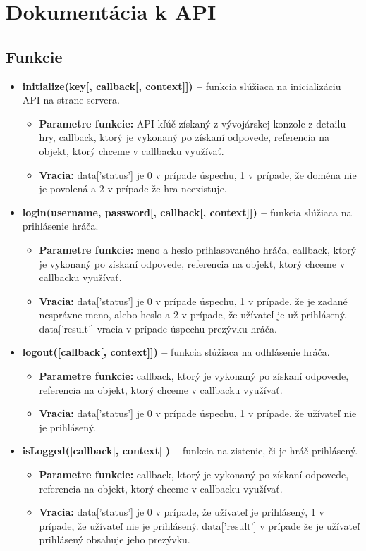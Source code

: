 \chapter{Dokumentácia k API}
\section{Funkcie}
\begin{itemize}
\item \textbf{initialize(key[, callback[, context]]) –} funkcia slúžiaca na inicializáciu API na strane servera. 
\begin{itemize}
\item \textbf{Parametre funkcie:} API kľúč získaný z vývojárskej konzole z detailu hry, callback, ktorý je vykonaný po získaní odpovede, referencia na objekt, ktorý chceme v callbacku využívať. 
\item \textbf{Vracia:} data['status'] je 0 v prípade úspechu, 1 v prípade, že doména nie je povolená a 2 v prípade že hra neexistuje.
\end{itemize}

\item \textbf{login(username, password[, callback[, context]]) –} funkcia slúžiaca na prihlásenie hráča.
\begin{itemize}
\item \textbf{Parametre funkcie:} meno a heslo prihlasovaného hráča, callback, ktorý je vykonaný po získaní odpovede, referencia na objekt, ktorý chceme v callbacku využívať. 
\item \textbf{Vracia:} data['status'] je 0 v prípade úspechu, 1 v prípade, že je zadané nesprávne meno, alebo heslo a 2 v prípade, že užívateľ je už prihlásený. data['result'] vracia v prípade úspechu prezývku hráča.
\end{itemize}

\item \textbf{logout([callback[, context]]) –} funkcia slúžiaca na odhlásenie hráča.
\begin{itemize}
\item \textbf{Parametre funkcie:} callback, ktorý je vykonaný po získaní odpovede, referencia na objekt, ktorý chceme v callbacku využívať. 
\item \textbf{Vracia:} data['status'] je 0 v prípade úspechu, 1 v prípade, že užívateľ nie je prihlásený.
\end{itemize}

\item \textbf{isLogged([callback[, context]]) –} funkcia na zistenie, či je hráč prihlásený.
\begin{itemize}
\item \textbf{Parametre funkcie:} callback, ktorý je vykonaný po získaní odpovede, referencia na objekt, ktorý chceme v callbacku využívať. 
\item \textbf{Vracia:} data['status'] je 0 v prípade, že užívateľ je prihlásený, 1 v prípade, že užívateľ nie je prihlásený. data['result'] v prípade že je užívateľ prihlásený obsahuje jeho prezývku.
\end{itemize}


\end{itemize}
